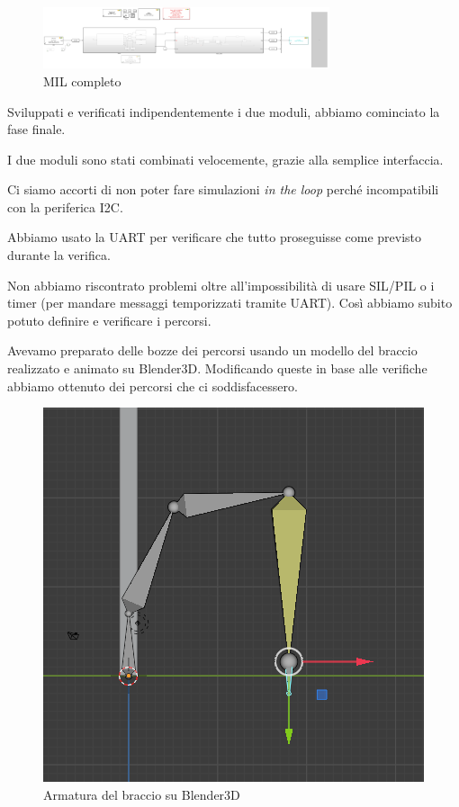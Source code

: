 \documentclass[12pt]{report}
\begin{document}
\begin{figure}[h] 
    \centering
    \includegraphics[width=0.75\textwidth]{images/Immagini sensore/Matlab_completo.png}
    \caption{MIL completo}
\end{figure}

Sviluppati e verificati indipendentemente i due moduli, abbiamo cominciato la fase finale.

I due moduli sono stati combinati velocemente, grazie alla semplice interfaccia.

Ci siamo accorti di non poter fare simulazioni \emph{in the loop} perché incompatibili con la periferica I2C.

Abbiamo usato la UART per verificare che tutto proseguisse come previsto durante la verifica.

Non abbiamo riscontrato problemi oltre all'impossibilità di usare SIL/PIL o i timer (per mandare messaggi temporizzati tramite UART). Così abbiamo subito potuto definire e verificare i percorsi.

Avevamo preparato delle bozze dei percorsi usando un modello del braccio realizzato e animato su Blender3D. Modificando queste in base alle verifiche abbiamo ottenuto dei percorsi che ci soddisfacessero.

\begin{figure}
\includegraphics[width=\textwidth]{Blender3D}
\caption{Armatura del braccio su Blender3D}
\end{figure}
\end{document}
